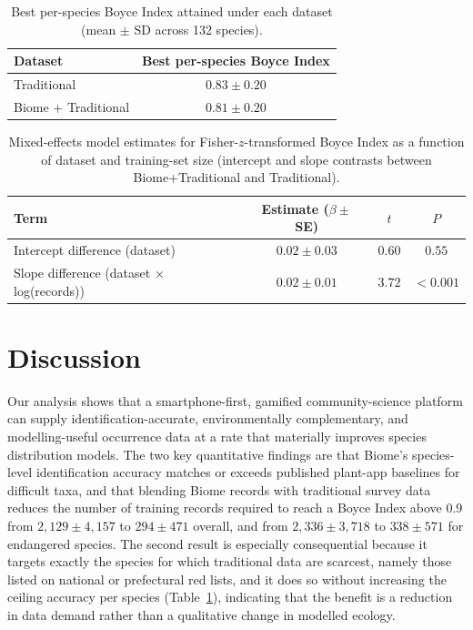 \documentclass[11pt]{article}
\begin{document}
\begin{table}[htbp]
\centering
\caption{Best per-species Boyce Index attained under each dataset (mean $\pm$ SD across 132 species).}
\label{tab:bestbi}
\begin{tabular}{lc}
\toprule
Dataset & Best per-species Boyce Index \\
\midrule
Traditional & $0.83 \pm 0.20$ \\
Biome + Traditional & $0.81 \pm 0.20$ \\
\bottomrule
\end{tabular}
\end{table}

\begin{table}[htbp]
\centering
\caption{Mixed-effects model estimates for Fisher-$z$-transformed Boyce Index as a function of dataset and training-set size (intercept and slope contrasts between Biome+Traditional and Traditional).}
\label{tab:glmm}
\begin{tabular}{lccc}
\toprule
Term & Estimate ($\beta \pm$ SE) & $t$ & $P$ \\
\midrule
Intercept difference (dataset) & $0.02 \pm 0.03$ & $0.60$ & $0.55$ \\
Slope difference (dataset $\times$ log(records)) & $0.02 \pm 0.01$ & $3.72$ & $<\!0.001$ \\
\bottomrule
\end{tabular}
\end{table}

\section{Discussion}

Our analysis shows that a smartphone-first, gamified community-science platform can supply identification-accurate, environmentally complementary, and modelling-useful occurrence data at a rate that materially improves species distribution models. The two key quantitative findings are that Biome's species-level identification accuracy matches or exceeds published plant-app baselines for difficult taxa, and that blending Biome records with traditional survey data reduces the number of training records required to reach a Boyce Index above 0.9 from $2{,}129 \pm 4{,}157$ to $294 \pm 471$ overall, and from $2{,}336 \pm 3{,}718$ to $338 \pm 571$ for endangered species. The second result is especially consequential because it targets exactly the species for which traditional data are scarcest, namely those listed on national or prefectural red lists, and it does so without increasing the ceiling accuracy per species (Table~\ref{tab:bestbi}), indicating that the benefit is a reduction in data demand rather than a qualitative change in modelled ecology.
\end{document}
